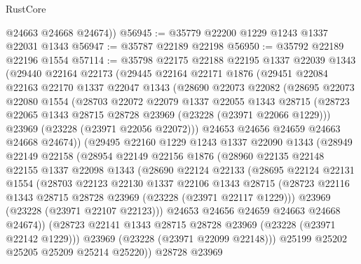 \begin{lexlean}{RustCore}
\begin{coremodule}
        @24663
        @24668
        @24674))
@56945 := @35779 @22200 @1229 @1243 @1337 @22031 @1343
@56947 := @35787 @22189 @22198
@56950 := @35792 @22189 @22196 @1554
@57114 := @35798
    @22175
    @22188
    @22195
    @1337
    @22039
    @1343
    (@29440
      @22164
      @22173
      (@29445
        @22164
        @22171
        @1876
        (@29451
          @22084
          @22163
          @22170
          @1337
          @22047
          @1343
          (@28690
            @22073
            @22082
            (@28695
              @22073
              @22080
              @1554
              (@28703
                @22072
                @22079
                @1337
                @22055
                @1343
                @28715
                (@28723 @22065 @1343 @28715 @28728 @23969 (@23228 (@23971 @22066 @1229)))
                @23969
                (@23228 (@23971 @22056 @22072)))
              @24653
              @24656
              @24659
              @24663
              @24668
              @24674))
          (@29495
            @22160
            @1229
            @1243
            @1337
            @22090
            @1343
            (@28949
              @22149
              @22158
              (@28954
                @22149
                @22156
                @1876
                (@28960
                  @22135
                  @22148
                  @22155
                  @1337
                  @22098
                  @1343
                  (@28690
                    @22124
                    @22133
                    (@28695
                      @22124
                      @22131
                      @1554
                      (@28703
                        @22123
                        @22130
                        @1337
                        @22106
                        @1343
                        @28715
                        (@28723 @22116 @1343 @28715 @28728 @23969 (@23228 (@23971 @22117 @1229)))
                        @23969
                        (@23228 (@23971 @22107 @22123)))
                      @24653
                      @24656
                      @24659
                      @24663
                      @24668
                      @24674))
                  (@28723 @22141 @1343 @28715 @28728 @23969 (@23228 (@23971 @22142 @1229)))
                  @23969
                  (@23228 (@23971 @22099 @22148)))
                @25199
                @25202
                @25205
                @25209
                @25214
                @25220))
            @28728
            @23969

\end{coremodule}
\end{lexlean}
